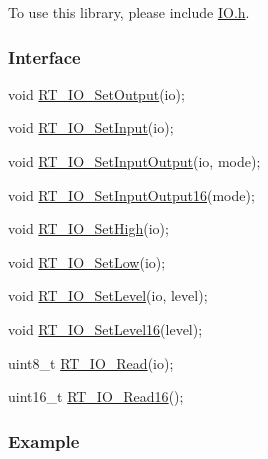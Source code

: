 To use this library, please include {\ttfamily \mbox{\hyperlink{a00014}{I\+O.\+h}}}.

\subsubsection*{Interface}


\begin{DoxyCode}
\textcolor{keywordtype}{void} \mbox{\hyperlink{a00014_a80f50c7de76076789b624b7fce7531c6}{RT\_IO\_SetOutput}}(io);

\textcolor{keywordtype}{void} \mbox{\hyperlink{a00014_ae333f1c232fdcb61b9e6ccaceeca2cec}{RT\_IO\_SetInput}}(io);

\textcolor{keywordtype}{void} \mbox{\hyperlink{a00014_ae845dc41cbf1b32b4d576373d1866d65}{RT\_IO\_SetInputOutput}}(io, mode);

\textcolor{keywordtype}{void} \mbox{\hyperlink{a00014_ade4bc867a36445fe0debc59cd5c9d9a5}{RT\_IO\_SetInputOutput16}}(mode);

\textcolor{keywordtype}{void} \mbox{\hyperlink{a00014_a752d981d1948aeae63c1a86070ae8e3a}{RT\_IO\_SetHigh}}(io);

\textcolor{keywordtype}{void} \mbox{\hyperlink{a00014_ae0e5eb1313d8307cf1362e997ee6f25e}{RT\_IO\_SetLow}}(io);

\textcolor{keywordtype}{void} \mbox{\hyperlink{a00014_a95fe40498ba314e1ea68aaa50335e7ef}{RT\_IO\_SetLevel}}(io, level);

\textcolor{keywordtype}{void} \mbox{\hyperlink{a00014_a5a3ae496ca3e12098c74c9f13b20c554}{RT\_IO\_SetLevel16}}(level);

uint8\_t \mbox{\hyperlink{a00014_aa69642c4177a35776090fdcf78d12e3b}{RT\_IO\_Read}}(io);

uint16\_t \mbox{\hyperlink{a00014_acf9c93d24ffeac5705da2c83ea2303d1}{RT\_IO\_Read16}}();
\end{DoxyCode}


\subsubsection*{Example}



